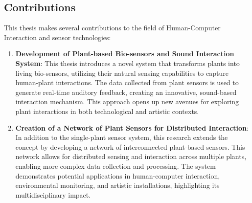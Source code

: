 \subsection{Contributions}

This thesis makes several contributions to the field of Human-Computer Interaction and sensor technologies:

\begin{enumerate}
    \item \textbf{Development of Plant-based Bio-sensors and Sound Interaction System}: This thesis introduces a novel system that transforms plants into living bio-sensors, utilizing their natural sensing capabilities to capture human-plant interactions. The data collected from plant sensors is used to generate real-time auditory feedback, creating an innovative, sound-based interaction mechanism. This approach opens up new avenues for exploring plant interactions in both technological and artistic contexts.
    \item \textbf{Creation of a Network of Plant Sensors for Distributed Interaction}: In addition to the single-plant sensor system, this research extends the concept by developing a network of interconnected plant-based sensors. This network allows for distributed sensing and interaction across multiple plants, enabling more complex data collection and processing. The system demonstrates potential applications in human-computer interaction, environmental monitoring, and artistic installations, highlighting its multidisciplinary impact.
\end{enumerate}
